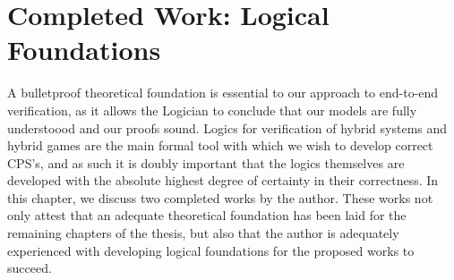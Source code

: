 \documentclass[12pt]{cmuthesis}
\theoremstyle{definition}
\theoremstyle{remark}
\begin{document}
\chapter{Completed Work:  Logical Foundations}
\label{ch:logical-foundations}
A bulletproof theoretical foundation is essential to our approach to end-to-end verification, as it allows the Logician to conclude that our models are fully understoood and our proofs sound.
Logics for verification of hybrid systems and hybrid games are the main formal tool with which we wish to develop correct CPS's, and as such it is doubly important that the logics themselves are developed with the absolute highest degree of certainty in their correctness.
In this chapter, we discuss two completed works by the author.
These works not only attest that an adequate theoretical foundation has been laid for the remaining chapters of the thesis, but also that the author is adequately experienced with developing logical foundations for the proposed works to succeed.
\end{document}
